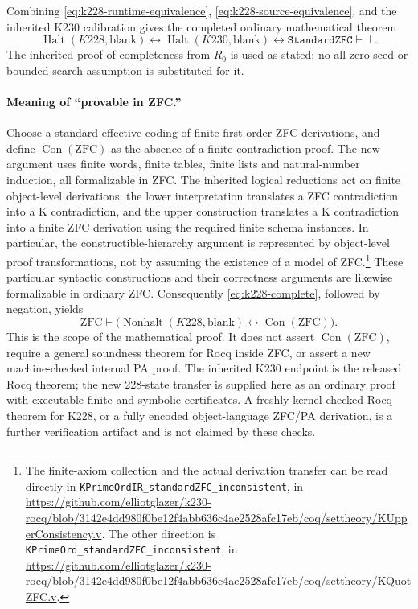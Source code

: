 Combining \eqref{eq:k228-runtime-equivalence},
\eqref{eq:k228-source-equivalence}, and the inherited K230 calibration
gives the completed ordinary mathematical theorem
\begin{equation}
 \operatorname{Halt}(K228,\mathrm{blank})
       \longleftrightarrow\operatorname{Halt}(K230,\mathrm{blank})
       \longleftrightarrow\texttt{StandardZFC}\vdash\bot.
 \label{eq:k228-complete}
\end{equation}
The inherited proof of completeness from $R_0$ is used as stated; no
all-zero seed or bounded search assumption is substituted for it.

\paragraph{Meaning of ``provable in ZFC.''}
Choose a standard effective coding of finite first-order ZFC derivations,
and define $\operatorname{Con}(\mathrm{ZFC})$ as the absence of a finite
contradiction proof.  The new argument uses finite words, finite tables,
finite lists and natural-number induction, all formalizable in ZFC.
The inherited logical reductions act on finite object-level derivations:
the lower interpretation translates a ZFC contradiction into a K
contradiction, and the upper construction translates a K contradiction
into a finite ZFC derivation using the required finite schema instances.
In particular, the constructible-hierarchy argument is represented by
object-level proof transformations, not by assuming the existence of a
model of ZFC.\footnote{The finite-axiom collection and the actual
derivation transfer can be read directly in
\texttt{KPrimeOrdIR\_standardZFC\_inconsistent}, in
\url{https://github.com/elliotglazer/k230-rocq/blob/3142e4dd980f0be12f4abb636c4ae2528afc17eb/coq/settheory/KUpperConsistency.v}.
The other direction is \texttt{KPrimeOrd\_standardZFC\_inconsistent}, in
\url{https://github.com/elliotglazer/k230-rocq/blob/3142e4dd980f0be12f4abb636c4ae2528afc17eb/coq/settheory/KQuotZFC.v}.}
These particular syntactic constructions and their
correctness arguments are likewise formalizable in ordinary ZFC.
Consequently \eqref{eq:k228-complete}, followed by negation, yields
\[
 \boxed{\quad
 \mathrm{ZFC}\vdash
 \bigl(\operatorname{Nonhalt}(K228,\mathrm{blank})
              \longleftrightarrow\operatorname{Con}(\mathrm{ZFC})\bigr).
 \quad}
\]
This is the scope of the mathematical proof.  It does not assert
$\operatorname{Con}(\mathrm{ZFC})$, require a general soundness theorem
for Rocq inside ZFC, or assert a new machine-checked internal PA proof.
The inherited K230 endpoint is the released Rocq theorem; the new
228-state transfer is supplied here as an ordinary proof with executable
finite and symbolic certificates.  A freshly kernel-checked Rocq theorem
for K228, or a fully encoded object-language ZFC/PA derivation, is a
further verification artifact and is not claimed by these checks.
